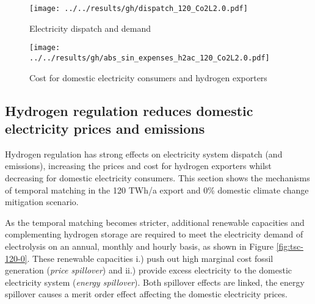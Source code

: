 \begin{figure*}[h!]
    \centering
    \begin{subfigure}[b]{0.49\linewidth}
        \centering
        \texttt{[image: ../../results/gh/dispatch\_120\_Co2L2.0.pdf]}
        \caption{Electricity dispatch and demand}
        \label{fig:dispatch_rule}
    \end{subfigure}
    \hfill
    \begin{subfigure}[b]{0.49\linewidth}
        \centering
        \texttt{[image: ../../results/gh/abs\_sin\_expenses\_h2ac\_120\_Co2L2.0.pdf]}
        \caption{Cost for domestic electricity consumers and hydrogen exporters}
        \label{fig:expense_h2ac}
    \end{subfigure}
    \hfill
    \caption{Electricity dispatch and demand (\ref{fig:dispatch_rule}) and cost for consumers (\ref{fig:expense_h2ac}) for various (hydrogen) temporal matching regimes in the 120 TWh/a export and 0\% climate change mitigation scenario. Stricter temporal matching decreases carbon-intensive electricity generation (coal \& gas) for hydrogen generation and even domestic electricity consumers (s. Fig. \ref{fig:dispatch_rule}). Cost for export hydrogen generation increase to fulfill the temporal matching constraint, whereas domestic electricity consumers profit from stricter hydrogen regulation.}
    \label{fig:expenses_rule}
\end{figure*}


\subsection*{Hydrogen regulation reduces domestic electricity prices and emissions}
\label{subsec:benefits_rule}

Hydrogen regulation has strong effects on electricity system dispatch (and emissions), increasing the prices and cost for hydrogen exporters whilst decreasing for domestic electricity consumers. This section shows the mechanisms of temporal matching in the 120 TWh/a export and 0\% domestic climate change mitigation scenario.

As the temporal matching becomes stricter, additional renewable capacities and complementing hydrogen storage are required to meet the electricity demand of electrolysis on an annual, monthly and hourly basis, as shown in Figure \ref{fig:tsc-120-0}. These renewable capacities i.) push out high marginal cost fossil generation (\textit{price spillover}) and ii.) provide excess electricity to the domestic electricity system (\textit{energy spillover}). Both spillover effects are linked, the energy spillover causes a merit order effect affecting the domestic electricity prices.


